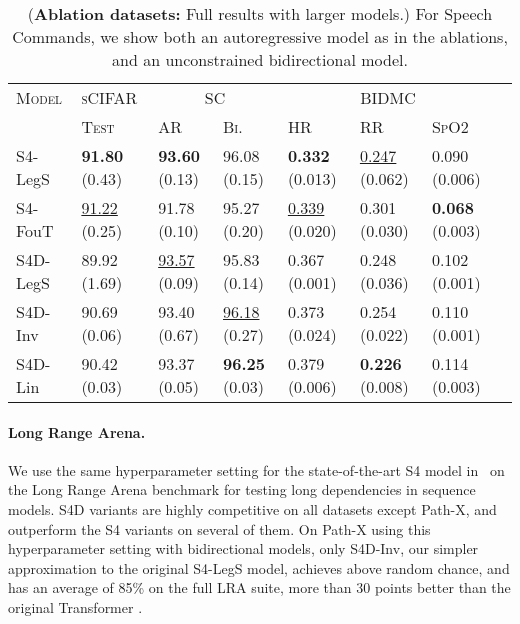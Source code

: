 \documentclass{article}
\newcommand{\para}[1]{\paragraph{#1}}
\begin{document}
\begin{table}[t!]
  \small
  \caption{
    (\textbf{Ablation datasets:} Full results with larger models.) For Speech Commands, we show both an autoregressive model as in the ablations, and an unconstrained bidirectional model.
  }
    \centering
    \begin{tabular}{@{}llllllll@{}}
        \toprule
        \textsc{Model}         & \textsc{sCIFAR}          & \multicolumn{2}{c}{\textsc{SC}} & \multicolumn{3}{c}{\textsc{BIDMC}} \\
        \cmidrule(lr){2-2} \cmidrule(lr){3-4} \cmidrule(lr){5-7}
                               & \textsc{Test}            & \textsc{AR}                     & \textsc{Bi.}                        & \textsc{HR}               & \textsc{RR}               & \textsc{SpO2}          \\
                               \midrule
                       S4-LegS & \textbf{91.80} (0.43)    & \textbf{93.60} (0.13)           & 96.08 (0.15)                        & \textbf{0.332} (0.013)    & \underline{0.247} (0.062) & 0.090 (0.006)          \\
    S4-FouT                    & \underline{91.22} (0.25) & 91.78 (0.10)                    & 95.27 (0.20)                        & \underline{0.339} (0.020) & 0.301 (0.030)             & \textbf{0.068} (0.003) \\
    \midrule
    S4D-LegS                   & 89.92 (1.69)             & \underline{93.57} (0.09)        & 95.83 (0.14)                        & 0.367 (0.001)             & 0.248 (0.036)             & 0.102 (0.001)          \\
    S4D-Inv                    & 90.69 (0.06)             & 93.40 (0.67)                    & \underline{96.18} (0.27)            & 0.373 (0.024)             & 0.254 (0.022)             & 0.110 (0.001)          \\
    S4D-Lin                    & 90.42 (0.03)             & 93.37 (0.05)                    & \textbf{96.25} (0.03)               & 0.379 (0.006)             & \textbf{0.226} (0.008)    & 0.114 (0.003)          \\
        \bottomrule
    \end{tabular}
    \label{tab:full}
\end{table}








\para{Long Range Arena.}

We use the same hyperparameter setting for the state-of-the-art S4 model in~\citep{gu2022hippo} on the Long Range Arena benchmark for testing long dependencies in sequence models.
S4D variants are highly competitive on all datasets except Path-X, and outperform the S4 variants on several of them.
On Path-X using this hyperparameter setting with bidirectional models,
only S4D-Inv, our simpler approximation to the original S4-LegS model, achieves above random chance,
and has an average of 85\% on the full LRA suite, more than 30 points better than the original Transformer \citep{tay2021long}.
\end{document}

